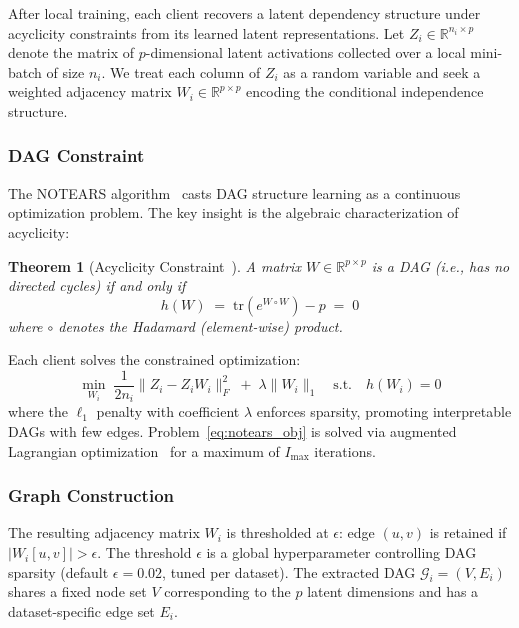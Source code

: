 \documentclass[journal]{IEEEtran}
\newtheorem{theorem}{Theorem}
\newcommand{\notears}{\textsc{NOTEARS}}
\newcommand{\RR}{\mathbb{R}}
\newcommand{\calG}{\mathcal{G}}
\begin{document}
After local training, each client recovers a latent dependency structure
under acyclicity constraints from its learned latent representations.
Let $Z_i \in \RR^{n_i \times p}$ denote
the matrix of $p$-dimensional latent activations collected over a local
mini-batch of size $n_i$. We treat each column of $Z_i$ as a random
variable and seek a weighted adjacency matrix $W_i \in \RR^{p \times p}$
encoding the conditional independence structure.

\subsubsection{DAG Constraint}

The \notears{} algorithm~\cite{zheng2018notears} casts DAG structure learning
as a continuous optimization problem. The key insight is the algebraic
characterization of acyclicity:

\begin{theorem}[Acyclicity Constraint~\cite{zheng2018notears}]
A matrix $W \in \RR^{p \times p}$ is a DAG (i.e., has no directed cycles)
if and only if
\begin{equation}
  h(W) \;=\; \mathrm{tr}\!\left(e^{W \circ W}\right) - p \;=\; 0
  \label{eq:dag}
\end{equation}
where $\circ$ denotes the Hadamard (element-wise) product.
\end{theorem}

Each client solves the constrained optimization:
\begin{equation}
  \min_{W_i}\; \frac{1}{2n_i}\|Z_i - Z_i W_i\|_F^2
  \;+\; \lambda \|W_i\|_1
  \quad \text{s.t.}\quad h(W_i) = 0
  \label{eq:notears_obj}
\end{equation}
where the $\ell_1$ penalty with coefficient $\lambda$ enforces sparsity,
promoting interpretable DAGs with few edges. Problem~\eqref{eq:notears_obj}
is solved via augmented Lagrangian optimization~\cite{zheng2018notears}
for a maximum of $I_{\max}$ iterations.

\subsubsection{Graph Construction}

The resulting adjacency matrix $W_i$ is thresholded at $\epsilon$:
edge $(u,v)$ is retained if $|W_i[u,v]| > \epsilon$.
The threshold $\epsilon$ is a global hyperparameter controlling DAG sparsity
(default $\epsilon = 0.02$, tuned per dataset). The extracted DAG
$\calG_i = (V, E_i)$ shares a fixed node set $V$ corresponding to the $p$
latent dimensions and has a dataset-specific edge set $E_i$.
\end{document}

